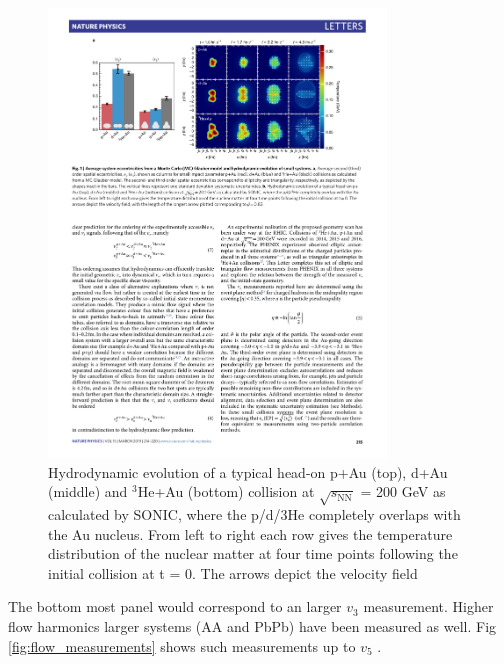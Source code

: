   \begin{figure}[htpb]
    \centering
    \includegraphics[width=0.8\textwidth]{Introduction/collision_geometries.pdf}
    \caption{Hydrodynamic evolution of a typical head-on p+Au (top), d+Au (middle) and $^3$He+Au (bottom) collision at $\sqrt{s_\mathrm{NN}}$ = 200 GeV as calculated by SONIC, where the p/d/3He completely overlaps with the Au nucleus. From left to right each row gives the temperature distribution of the nuclear matter at four time points following the initial collision at t = 0. The arrows depict the velocity field}
    \label{fig:collision_geometries}
  \end{figure}

  The bottom most panel would correspond to an larger $v_3$ measurement. Higher flow harmonics larger systems (AA and PbPb) have been measured as well. Fig \ref{fig:flow_measurements} shows such measurements up to $v_5$ \cite{Aamodt2011}. 

